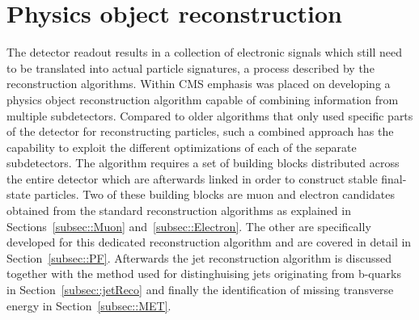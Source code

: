\section{Physics object reconstruction} \label{sec::PhysicsObjects}

The detector readout results in a collection of electronic signals which still need to be translated into actual particle signatures, a process described by the reconstruction algorithms.
Within CMS emphasis was placed on developing a physics object reconstruction algorithm capable of combining information from multiple subdetectors. 
Compared to older algorithms that only used specific parts of the detector for reconstructing particles, such a combined approach has the capability to exploit the different optimizations of each of the separate subdetectors.
The algorithm requires a set of building blocks distributed across the entire detector which are afterwards linked in order to construct stable final-state particles.
Two of these building blocks are muon and electron candidates obtained from the standard reconstruction algorithms as explained in Sections~\ref{subsec::Muon} and~\ref{subsec::Electron}. The other are specifically developed for this dedicated reconstruction algorithm and are covered in detail in Section~\ref{subsec::PF}.
Afterwards the jet reconstruction algorithm is discussed together with the method used for distinghuising jets originating from b-quarks in Section~\ref{subsec::jetReco} and finally the identification of missing transverse energy in Section~\ref{subsec::MET}.

